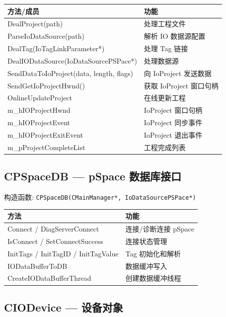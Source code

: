 \documentclass[12pt,a4paper]{ctexart}
\begin{document}
\begin{table}[H]\centering
\begin{tabular}{lp{7cm}}
\toprule
\textbf{方法/成员} & \textbf{功能} \\
\midrule
DealProject(path) & 处理工程文件 \\
ParseIoDataSource(path) & 解析 IO 数据源配置 \\
DealTag(IoTagLinkParameter*) & 处理 Tag 链接 \\
DealIODataSource(IoDataSourcePSPace*) & 处理数据源 \\
SendDataToIoProject(data, length, flags) & 向 IoProject 发送数据 \\
SendGetIoProjectHwnd() & 获取 IoProject 窗口句柄 \\
OnlineUpdateProject & 在线更新工程 \\
m\_hIOProjectHwnd & IoProject 窗口句柄 \\
m\_hIOProjectEvent & IoProject 同步事件 \\
m\_hIOProjectExitEvent & IoProject 退出事件 \\
m\_pProjectCompleteList & 工程完成列表 \\
\bottomrule
\end{tabular}
\end{table}

\subsection{CPSpaceDB — pSpace 数据库接口}

构造函数: \texttt{CPSpaceDB(CMainManager*, IoDataSourcePSPace*)}

\begin{table}[H]\centering
\begin{tabular}{lp{7cm}}
\toprule
\textbf{方法} & \textbf{功能} \\
\midrule
Connect / DiagServerConnect & 连接/诊断连接 pSpace \\
IsConnect / SetConnectSuccess & 连接状态管理 \\
InitTags / InitTagID / InitTagValue & Tag 初始化和解析 \\
IODataBufferToDB & 数据缓冲写入 \\
CreateIODataBufferThread & 创建数据缓冲线程 \\
\bottomrule
\end{tabular}
\end{table}

\subsection{CIODevice — 设备对象}
\end{document}
